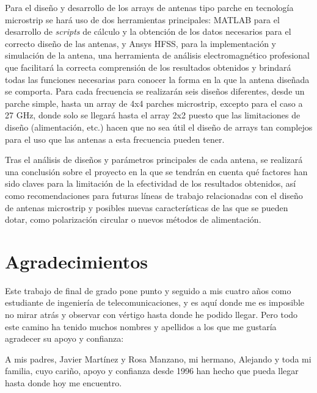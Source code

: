 \par Para el diseño y desarrollo de los arrays de antenas tipo parche en tecnología microstrip se hará uso de dos herramientas principales: MATLAB para el desarrollo de \textit{scripts} de cálculo y la obtención de los datos necesarios para el correcto diseño de las antenas, y Ansys HFSS, para la implementación y simulación de la antena, una herramienta de análisis electromagnético profesional que facilitará la correcta comprensión de los resultados obtenidos y brindará todas las funciones necesarias para conocer la forma en la que la antena diseñada se comporta. Para cada frecuencia se realizarán seis diseños diferentes, desde un parche simple, hasta un array de 4x4 parches microstrip, excepto para el caso a 27 GHz, donde solo se llegará hasta el array 2x2 puesto que las limitaciones de diseño (alimentación, etc.) hacen que no sea útil el diseño de arrays tan complejos para el uso que las antenas a esta frecuencia pueden tener.
\\
\par Tras el análisis de diseños y parámetros principales de cada antena, se realizará una conclusión sobre el proyecto en la que se tendrán en cuenta qué factores han sido claves para la limitación de la efectividad de los resultados obtenidos, así como recomendaciones para futuras líneas de trabajo relacionadas con el diseño de antenas microstrip y posibles nuevas características de las que se pueden dotar, como polarización circular o nuevos métodos de alimentación.






\cleardoublepage %
\chapter*{Agradecimientos}

\thispagestyle{empty}
\vspace{1cm}

\par Este trabajo de final de grado pone punto y seguido a mis cuatro años como estudiante de ingeniería de telecomunicaciones, y es aquí donde me es imposible no mirar atrás y observar con vértigo hasta donde he podido llegar.
Pero todo este camino ha tenido muchos nombres y apellidos a los que me gustaría agradecer su apoyo y confianza:

\par A mis padres, Javier Martínez y Rosa Manzano, mi hermano, Alejando y toda mi familia, cuyo cariño, apoyo y confianza desde 1996 han hecho que pueda llegar hasta donde hoy me encuentro.



